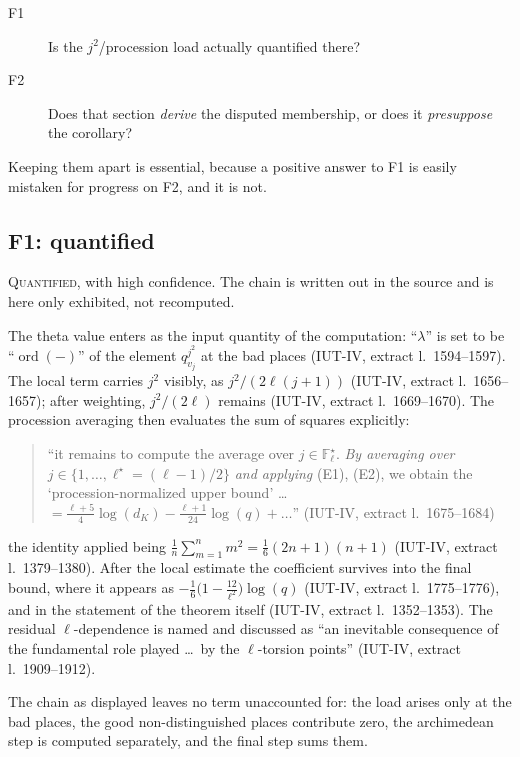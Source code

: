 \documentclass[11pt,a4paper]{article}
\theoremstyle{definition}
\newcommand{\ordd}{\operatorname{ord}}
\newcommand{\anchor}[2]{(#1, extract l.~#2)}
\begin{document}
\begin{description}
\item[F1] Is the $j^2$/procession load actually quantified there?
\item[F2] Does that section \emph{derive} the disputed membership, or does it
  \emph{presuppose} the corollary?
\end{description}

Keeping them apart is essential, because a positive answer to F1 is easily
mistaken for progress on F2, and it is not.

\subsection{F1: quantified}

\textsc{Quantified}, with high confidence. The chain is written out in the source
and is here only exhibited, not recomputed.

The theta value enters as the input quantity of the computation: ``$\lambda$'' is
set to be ``$\ordd(-)$'' of the element $q_{v_j}^{j^2}$ at the bad places
\anchor{IUT-IV}{1594--1597}. The local term carries $j^2$ visibly, as
$j^2/(2\ell(j+1))$ \anchor{IUT-IV}{1656--1657}; after weighting, $j^2/(2\ell)$
remains \anchor{IUT-IV}{1669--1670}. The procession averaging then evaluates the
sum of squares explicitly:

\begin{quote}\small
``it remains to compute the average over $j \in \mathbb{F}_\ell^\star$.
\emph{By averaging over} $j \in \{1,\dots,\ell^\star = (\ell-1)/2\}$ \emph{and
applying} (E1), (E2), we obtain the `procession-normalized upper bound'
\dots\ $= \frac{\ell+5}{4}\log(d_K) - \frac{\ell+1}{24}\log(q) + \dots$''
\hfill\anchor{IUT-IV}{1675--1684}
\end{quote}

the identity applied being $\frac{1}{n}\sum_{m=1}^{n} m^2 =
\frac{1}{6}(2n+1)(n+1)$ \anchor{IUT-IV}{1379--1380}. After the local estimate the
coefficient survives into the final bound, where it appears as
$-\frac{1}{6}\bigl(1 - \frac{12}{\ell^2}\bigr)\log(q)$
\anchor{IUT-IV}{1775--1776}, and in the statement of the theorem itself
\anchor{IUT-IV}{1352--1353}. The residual $\ell$-dependence is named and discussed
as ``an inevitable consequence of the fundamental role played \dots\ by the
$\ell$-torsion points'' \anchor{IUT-IV}{1909--1912}.

The chain as displayed leaves no term unaccounted for: the load arises only at the
bad
places, the good non-distinguished places contribute zero, the archimedean step is
computed separately, and the final step sums them.
\end{document}
